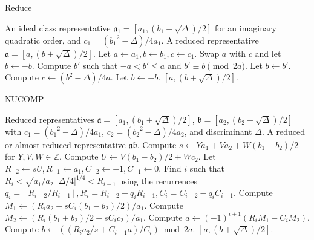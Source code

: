 \documentclass{ucalgthes1}
\theoremstyle{plain}
\theoremstyle{definition}
\newcommand{\ZZ}{\mathbb{Z}}
\newcommand{\floor}[1]{\left\lfloor #1 \right\rfloor}
\begin{document}
\begin{algorithm}[h]
\caption{Reduce}
\label{alg:reduce}
\begin{algorithmic}[1]
\REQUIRE An ideal class representative $\mathfrak a_1 = [a_1, (b_1+\sqrt\Delta)/2]$ for an imaginary quadratic order, and $c_1 = ({b_1}^2 - \Delta)/4a_1$.
\ENSURE A reduced representative $\mathfrak a = [a, (b+\sqrt\Delta)/2]$.
\STATE Let $a \leftarrow a_1, b \leftarrow b_1, c \leftarrow c_1$.
		\STATE Swap $a$ with $c$ and let $b \leftarrow -b$.
	\ENDIF
		\STATE Compute $b'$ such that $-a < b' \le a$ and $b' \equiv b \pmod{2a}$.
		\STATE Let $b \leftarrow b'$.
		\STATE Compute $c \leftarrow (b^2-\Delta)/4a$.
	\ENDIF
\ENDWHILE
{}
	\STATE Let $b \leftarrow -b$.
\ENDIF
\RETURN $[a, (b+\sqrt\Delta)/2]$.
\end{algorithmic}
\end{algorithm}



\begin{comment}
\begin{algorithm}[h]
\caption{Is Ambiguous?}
\label{alg:ambiguous}
\begin{algorithmic}[1]
\REQUIRE A reduced representative $\mathfrak a = [a, (b+\sqrt\Delta)/2]$.
\ENSURE True if $\mathfrak a$ is ambiguous, False otherwise.
\IF {$a > 1$}
	\IF {$b = 0$ or $a = b$ or $a = c$}
		\RETURN True.
	\ENDIF
\ENDIF
\RETURN False.
\end{algorithmic}
\end{algorithm}
\end{comment}

\begin{algorithm}[h]
\caption{NUCOMP}
\label{alg:nucomp}
\begin{algorithmic}[1]
\REQUIRE Reduced representatives $\mathfrak a = [a_1, (b_1+\sqrt\Delta)/2]$, $\mathfrak b = [a_2, (b_2+\sqrt\Delta)/2]$ with \break $c_1 = ({b_1}^2-\Delta)/4a_1$, $c_2 = ({b_2}^2-\Delta)/4a_2$, and discriminant $\Delta$.
\ENSURE A reduced or almost reduced representative $\mathfrak a \mathfrak b$.
\STATE Compute $s \leftarrow Ya_1 + Va_2 + W (b_1+b_2)/2$ for $Y, V, W \in \ZZ$.
\STATE Compute $U \leftarrow V(b_1-b_2)/2 + Wc_2$.
\STATE Let $R_{-2} \leftarrow sU, R_{-1} \leftarrow a_1, C_{-2} \leftarrow -1, C_{-1} \leftarrow 0$.
\STATE Find $i$ such that $R_i < \sqrt{a_1/a_2} ~ |\Delta/4|^{1/4} < R_{i-1}$ using the recurrences \break $q_i = \floor{R_{i-2}/R_{i-1}}, R_i = R_{i-2}-q_i R_{i-1}, C_i=C_{i-2}-q_i C_{i-1}$.
\STATE Compute $M_1 \leftarrow (R_i a_2 + sC_i(b_1-b_2)/2)/a_1$.
\STATE Compute $M_2 \leftarrow (R_i (b_1+b_2)/2 -sC_i c_2)/a_1$.
\STATE Compute $a \leftarrow (-1)^{i+1}(R_i M_1 - C_i M_2)$.
\STATE Compute $b \leftarrow ((R_i a_2/s + C_{i-1} a)/C_i) \bmod{2a}$.
\RETURN $[a, (b+\sqrt\Delta)/2]$.
\end{algorithmic}
\end{algorithm}
\end{document}
